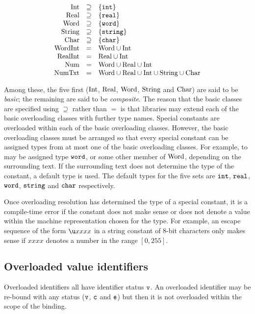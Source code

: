 \begin{displaymath}
  \begin{array}{rcl}
    \Int &\supseteq& \{\INT\}\\
    \Real &\supseteq& \{\REAL\}\\
    \Word &\supseteq& \{\WORD\}\\
    \String &\supseteq& \{\STRING\}\\
    \Char &\supseteq& \{\CHAR\}\\
    \WordInt &=& \Word\cup\INt\\
    \RealInt &=& \Real\cup\INt\\
    \Num &=& \Word\cup\Real\cup\INt\\
    \NumTxt &=& \Word\cup\Real\cup\INt\cup\String\cup\Char\\
  \end{array}%
\end{displaymath}%

\noindent
Among these, the five first (${\rm Int}$, $\mbox{\rm Real}$, $\mbox{\rm Word}$, $\mbox{\rm String}$ and $\mbox{\rm Char}$) are said to be
{\sl basic}; the remaining are said to be {\sl composite}.
The reason that the basic classes are specified using
$\supseteq$ rather than $=$ is that libraries may extend
each of the  basic overloading
classes with further type names.
Special constants are overloaded
within each of the basic overloading classes.  However, the basic
overloading classes must be arranged so that every special constant can be
assigned types from at most one of the basic overloading classes.  For
example, to  may be assigned type $\mbox{\tt word}$, or
some other member of $\mbox{\rm Word}$, depending on the surrounding text.  If
the surrounding text does not determine the type of the constant, a
default type is used. The default types for the five sets are $\mbox{\tt int}$,
$\mbox{\tt real}$, $\mbox{\tt word}$, $\mbox{\tt string}$ and $\mbox{\tt char}$ respectively.

       Once overloading resolution has determined the type of a special constant,
       it is a compile-time error if the constant does not make sense or does not
       denote a value within the machine representation chosen for the type.
       For example, an escape sequence of the form $\uconst$ in a string constant
       of 8-bit characters only makes sense if $xxxx$  denotes
       a number in the range $[0, 255]$.


\subsection{Overloaded value identifiers}
Overloaded identifiers all have identifier status $\hbox{\tt v}$. An
overloaded identifier may be re-bound with any status ($\hbox{\tt v}$, $\hbox{\tt c}$
and $\hbox{\tt e}$) but then it is not overloaded within the scope of
the binding.


